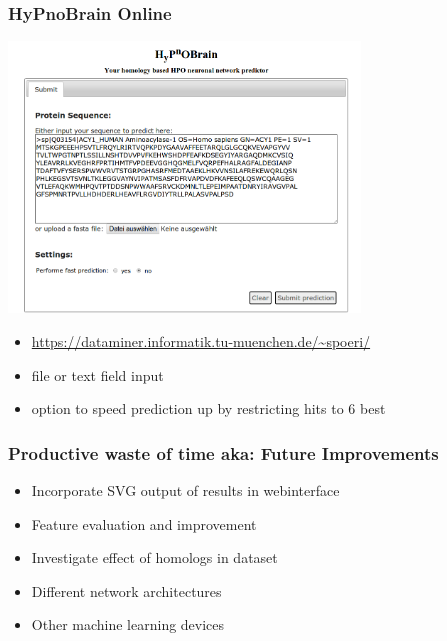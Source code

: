 \documentclass{beamer}
\begin{document}

\begin{frame}[fragile]
	\frametitle{HyPnoBrain Online}
\begin{center}
\includegraphics[width=0.7\textwidth]{webinterface.png}
\end{center}

\begin{itemize}
	\item \url{https://dataminer.informatik.tu-muenchen.de/~spoeri/}
	\item file or text field input
	\item option to speed prediction up by restricting hits to 6 best
\end{itemize}

\end{frame}

\begin{frame}
	\frametitle{Productive waste of time aka: Future Improvements}
	\begin{itemize}
		\item Incorporate SVG output of results in webinterface
		\item Feature evaluation and improvement
		\item Investigate effect of homologs in dataset
		\item Different network architectures 
		\item Other machine learning devices
	\end{itemize}		
	
\end{frame}
\end{document}
